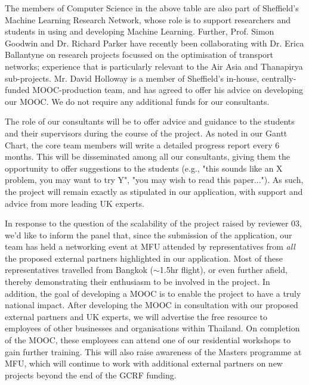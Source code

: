 \documentclass[11pt]{article}
\begin{document}
\noindent
The members of Computer Science in the above table are also part of Sheffield's Machine Learning Research Network, whose role is to support researchers and students in using and developing Machine Learning. Further, Prof. Simon Goodwin and Dr. Richard Parker have recently been collaborating with Dr. Erica Ballantyne on research projects focussed on the optimisation of transport networks; experience that is particularly relevant to the Air Asia and Thanapirya sub-projects. Mr. David Holloway is a member of Sheffield's in-house, centrally-funded MOOC-production team, and has agreed to offer his advice on developing our MOOC. We do not require any additional funds for our consultants.

\vspace{2mm}
\noindent
The role of our consultants will be to offer advice and guidance to the students and their supervisors during the course of the project. As noted in our Gantt Chart, the core team members will write a detailed progress report every 6 months. This will be disseminated among all our consultants, giving them the opportunity to offer suggestions to the students (e.g., "this sounds like an X problem, you may want to try Y", "you may wish to read this paper..."). As such, the project will remain exactly as stipulated in our application, with support and advice from more leading UK experts. 

\vspace{2mm}
\noindent
In response to the question of the scalability of the project raised by reviewer 03, we'd like to inform the panel that, since the submission of the application, our team has held a networking event at MFU attended by representatives from {\it all} the proposed external partners highlighted in our application. Most of these representatives travelled from Bangkok ($\sim$1.5hr flight), or even further afield, thereby demonstrating their enthusiasm to be involved in the project. In addition, the goal of developing a MOOC is to enable the project to have a truly national impact. After developing the MOOC in consultation with our proposed external partners and UK experts, we will advertise the free resource to employees of other businesses and organisations within Thailand. On completion of the MOOC, these employees can attend one of our residential workshops to gain further training. This will also raise awareness of the Masters programme at MFU, which will continue to work with additional external partners on new projects beyond the end of the GCRF funding.
\end{document}
